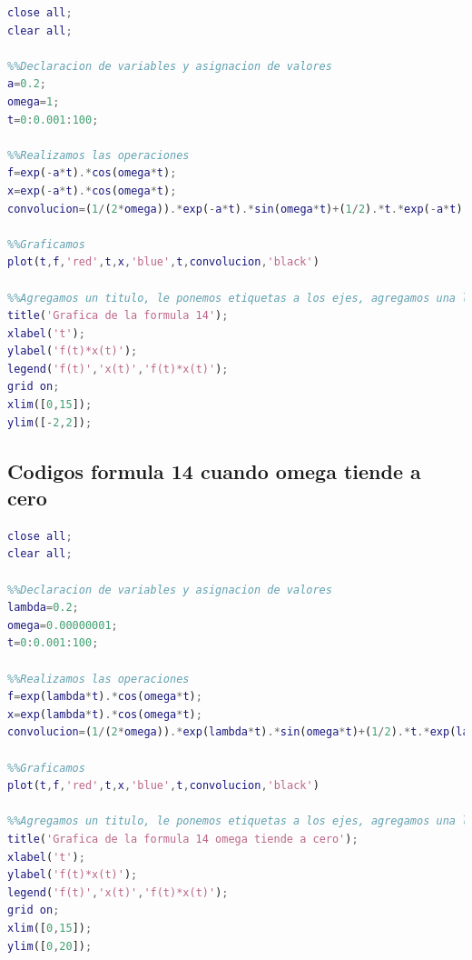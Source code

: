 \documentclass[10pt]{article}
\begin{document}
\begin{lstlisting}[language=Matlab,label=grafica14,caption=Código para graficar la formula 14]
%%Cierra todas las ventanas y limpia las variables almacenadas
close all;
clear all;

%%Declaracion de variables y asignacion de valores
a=0.2;
omega=1;
t=0:0.001:100;

%%Realizamos las operaciones
f=exp(-a*t).*cos(omega*t);
x=exp(-a*t).*cos(omega*t);
convolucion=(1/(2*omega)).*exp(-a*t).*sin(omega*t)+(1/2).*t.*exp(-a*t).*cos(omega*t);

%%Graficamos
plot(t,f,'red',t,x,'blue',t,convolucion,'black')

%%Agregamos un titulo, le ponemos etiquetas a los ejes, agregamos una leyenda a la grafica, le ponemos cuadricula y le asignamos limites a los ejes x e y 
title('Grafica de la formula 14');
xlabel('t');
ylabel('f(t)*x(t)');
legend('f(t)','x(t)','f(t)*x(t)');
grid on;
xlim([0,15]);
ylim([-2,2]);
\end{lstlisting}


\newpage
\subsection{Codigos formula 14 cuando omega tiende a cero}

\begin{lstlisting}[language=Matlab,label=grafica14omegacero,caption=Código para graficar la formula 14]
%%Cierra todas las ventanas y limpia las variables almacenadas
close all;
clear all;

%%Declaracion de variables y asignacion de valores
lambda=0.2;
omega=0.00000001;
t=0:0.001:100;

%%Realizamos las operaciones
f=exp(lambda*t).*cos(omega*t);
x=exp(lambda*t).*cos(omega*t);
convolucion=(1/(2*omega)).*exp(lambda*t).*sin(omega*t)+(1/2).*t.*exp(lambda*t).*cos(omega*t);

%%Graficamos
plot(t,f,'red',t,x,'blue',t,convolucion,'black')

%%Agregamos un titulo, le ponemos etiquetas a los ejes, agregamos una leyenda a la grafica, le ponemos cuadricula y le asignamos limites a los ejes x e y 
title('Grafica de la formula 14 omega tiende a cero');
xlabel('t');
ylabel('f(t)*x(t)');
legend('f(t)','x(t)','f(t)*x(t)');
grid on;
xlim([0,15]);
ylim([0,20]);
\end{lstlisting}

\clearpage
\nocite{*}
\small{
}
\end{document}
